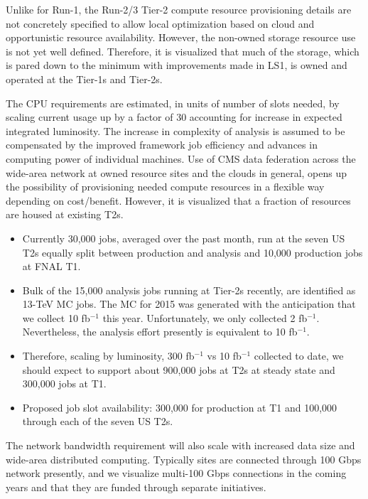 \documentclass[11pt,a4paper]{article}
\begin{document}

Unlike for Run-1, the Run-2/3 Tier-2 compute resource provisioning
details are not concretely specified to allow local optimization based
on cloud and opportunistic resource availability. However, the
non-owned storage resource use is not yet well defined. Therefore, it
is visualized that much of the storage, which is pared down to the
minimum with improvements made in LS1, is owned and operated at the
Tier-1s and Tier-2s.

The CPU requirements are estimated, in units of number of slots
needed, by scaling current usage up by a factor of 30 accounting for
increase in expected integrated luminosity.  The increase in
complexity of analysis is assumed to be compensated by the improved
framework job efficiency and advances in computing power of individual
machines.  Use of CMS data federation across the wide-area network at
owned resource sites and the clouds in general, opens up the
possibility of provisioning needed compute resources in a flexible way
depending on cost/benefit.  However, it is visualized that a fraction
of resources are housed at existing T2s.

\begin{itemize}
\item Currently 30,000 jobs, averaged over the past month, run at the seven 
US T2s equally split between production and analysis and 10,000 production
jobs at FNAL T1.
\item Bulk of the 15,000 analysis jobs running at Tier-2s recently, are 
identified as 13-TeV MC jobs.  The MC for 2015 was generated with the
anticipation that we collect 10 fb$^{-1}$ this year.  Unfortunately,
we only collected 2 fb$^{-1}$.  Nevertheless, the analysis effort 
presently is equivalent to 10 fb$^{-1}$.
\item Therefore, scaling by luminosity, 300 fb$^{-1}$ vs 10 fb$^{-1}$ collected 
to date, we should expect to support about 900,000 jobs at T2s at steady state 
and 300,000 jobs at T1.
\item Proposed job slot availability: 300,000 for production at T1 and 100,000 through each of the seven US T2s.
\end{itemize}


The network bandwidth requirement will also scale with increased data
size and wide-area distributed computing.  Typically sites are
connected through 100 Gbps network presently, and we visualize
multi-100 Gbps connections in the coming years and that they are
funded through separate initiatives.
\end{document}
